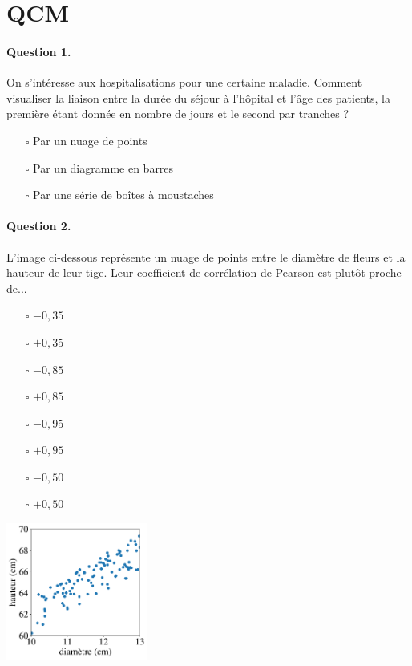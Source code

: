 \section{QCM}
\paragraph{Question 1.} On s'intéresse aux hospitalisations pour une certaine
maladie. Comment visualiser la liaison entre la durée du séjour à l'hôpital et
l'âge des patients, la première étant donnée en nombre de jours et le second
par tranches ?
\begin{itemize}
	\item[$\square$] Par un nuage de points 
	\item[$\square$] Par un diagramme en barres
	\item[$\square$] Par une série de boîtes à moustaches
\end{itemize}

\paragraph{Question 2.} L'image ci-dessous représente un nuage de points entre
le diamètre de fleurs et la hauteur de leur tige. Leur coefficient de
corrélation de Pearson est plutôt proche de...
\begin{itemize}
	\item[$\square$] $- 0,35$
	\item[$\square$] $+ 0,35$
	\item[$\square$] $- 0,85$
	\item[$\square$] $+ 0,85$
	\item[$\square$] $- 0,95$
	\item[$\square$] $+ 0,95$
	\item[$\square$] $- 0,50$
	\item[$\square$] $+ 0,50$
\end{itemize}

\vspace{-13em}
\begin{center}
	\includegraphics[width=0.35\textwidth]{figures/pearson_example}
\end{center}



